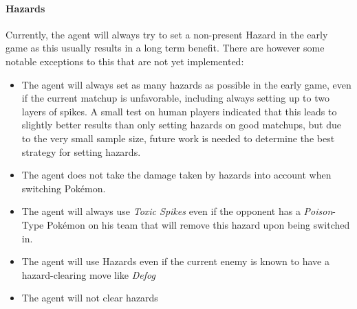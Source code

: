 \paragraph{Hazards}
Currently, the agent will always try to set a non-present Hazard in the early game as this usually 
results in a long term benefit. There are however some notable exceptions to this that 
are not yet implemented:
\begin{itemize}
  \item The agent will always set as many hazards as possible in the early game, even if the current matchup 
  is unfavorable, including always setting up to two layers of spikes. A small test on human players indicated
  that this leads to slightly better results than only setting hazards on good matchups, but due to the very
  small sample size, future work is needed to determine the best strategy for setting hazards.
  \item The agent does not take the damage taken by hazards into account when switching Pokémon. 
  \item The agent will always use \textit{Toxic Spikes} even if the opponent has a \textit{Poison}-Type
  Pokémon on his team that will remove this hazard upon being switched in.
  \item The agent will use Hazards even if the current enemy is known to have a hazard-clearing move like
  \textit{Defog} ~\autocite{Bulbapedia:Defog}
  \item The agent will not clear hazards
\end{itemize}

